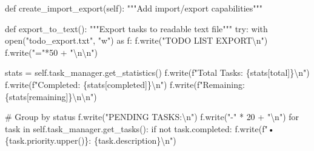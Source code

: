 \documentclass[
  letterpaper,
  DIV=11,
  numbers=noendperiod,
  oneside]{scrreprt}
\newenvironment{Shaded}{}{}
\newcommand{\BuiltInTok}[1]{\textcolor[rgb]{0.84,0.23,0.29}{#1}}
\newcommand{\CharTok}[1]{\textcolor[rgb]{0.01,0.18,0.38}{#1}}
\newcommand{\CommentTok}[1]{\textcolor[rgb]{0.42,0.45,0.49}{#1}}
\newcommand{\ControlFlowTok}[1]{\textcolor[rgb]{0.84,0.23,0.29}{#1}}
\newcommand{\DecValTok}[1]{\textcolor[rgb]{0.00,0.36,0.77}{#1}}
\newcommand{\ImportTok}[1]{\textcolor[rgb]{0.01,0.18,0.38}{#1}}
\newcommand{\KeywordTok}[1]{\textcolor[rgb]{0.84,0.23,0.29}{#1}}
\newcommand{\NormalTok}[1]{\textcolor[rgb]{0.14,0.16,0.18}{#1}}
\newcommand{\OperatorTok}[1]{\textcolor[rgb]{0.14,0.16,0.18}{#1}}
\newcommand{\SpecialCharTok}[1]{\textcolor[rgb]{0.00,0.36,0.77}{#1}}
\newcommand{\SpecialStringTok}[1]{\textcolor[rgb]{0.01,0.18,0.38}{#1}}
\newcommand{\StringTok}[1]{\textcolor[rgb]{0.01,0.18,0.38}{#1}}
\newcommand{\VariableTok}[1]{\textcolor[rgb]{0.89,0.38,0.04}{#1}}
\begin{document}
\begin{Shaded}
\begin{Highlighting}[]
\KeywordTok{def}\NormalTok{ create\_import\_export(}\VariableTok{self}\NormalTok{):}
    \CommentTok{"""Add import/export capabilities"""}
    
    \KeywordTok{def}\NormalTok{ export\_to\_text():}
        \CommentTok{"""Export tasks to readable text file"""}
        \ControlFlowTok{try}\NormalTok{:}
            \ControlFlowTok{with} \BuiltInTok{open}\NormalTok{(}\StringTok{"todo\_export.txt"}\NormalTok{, }\StringTok{"w"}\NormalTok{) }\ImportTok{as}\NormalTok{ f:}
\NormalTok{                f.write(}\StringTok{"TODO LIST EXPORT}\CharTok{\textbackslash{}n}\StringTok{"}\NormalTok{)}
\NormalTok{                f.write(}\StringTok{"="}\OperatorTok{*}\DecValTok{50} \OperatorTok{+} \StringTok{"}\CharTok{\textbackslash{}n\textbackslash{}n}\StringTok{"}\NormalTok{)}
                
\NormalTok{                stats }\OperatorTok{=} \VariableTok{self}\NormalTok{.task\_manager.get\_statistics()}
\NormalTok{                f.write(}\SpecialStringTok{f"Total Tasks: }\SpecialCharTok{\{}\NormalTok{stats[}\StringTok{\textquotesingle{}total\textquotesingle{}}\NormalTok{]}\SpecialCharTok{\}}\CharTok{\textbackslash{}n}\SpecialStringTok{"}\NormalTok{)}
\NormalTok{                f.write(}\SpecialStringTok{f"Completed: }\SpecialCharTok{\{}\NormalTok{stats[}\StringTok{\textquotesingle{}completed\textquotesingle{}}\NormalTok{]}\SpecialCharTok{\}}\CharTok{\textbackslash{}n}\SpecialStringTok{"}\NormalTok{)}
\NormalTok{                f.write(}\SpecialStringTok{f"Remaining: }\SpecialCharTok{\{}\NormalTok{stats[}\StringTok{\textquotesingle{}remaining\textquotesingle{}}\NormalTok{]}\SpecialCharTok{\}}\CharTok{\textbackslash{}n\textbackslash{}n}\SpecialStringTok{"}\NormalTok{)}
                
                \CommentTok{\# Group by status}
\NormalTok{                f.write(}\StringTok{"PENDING TASKS:}\CharTok{\textbackslash{}n}\StringTok{"}\NormalTok{)}
\NormalTok{                f.write(}\StringTok{"{-}"} \OperatorTok{*} \DecValTok{20} \OperatorTok{+} \StringTok{"}\CharTok{\textbackslash{}n}\StringTok{"}\NormalTok{)}
                \ControlFlowTok{for}\NormalTok{ task }\KeywordTok{in} \VariableTok{self}\NormalTok{.task\_manager.get\_tasks():}
                    \ControlFlowTok{if} \KeywordTok{not}\NormalTok{ task.completed:}
\NormalTok{                        f.write(}\SpecialStringTok{f"• }\SpecialCharTok{\{}\NormalTok{task}\SpecialCharTok{.}\NormalTok{priority}\SpecialCharTok{.}\NormalTok{upper()}\SpecialCharTok{\}}\SpecialStringTok{: }\SpecialCharTok{\{}\NormalTok{task}\SpecialCharTok{.}\NormalTok{description}\SpecialCharTok{\}}\CharTok{\textbackslash{}n}\SpecialStringTok{"}\NormalTok{)}
                

\end{Highlighting}
\end{Shaded}
\end{document}

